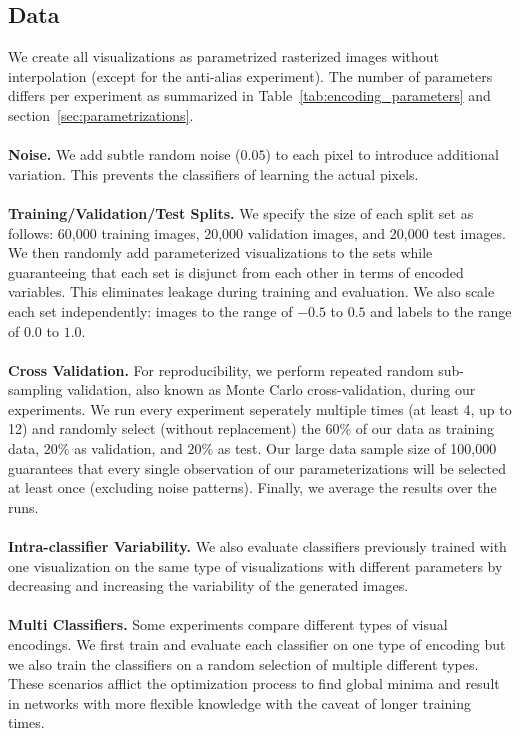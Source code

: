 \subsection{Data}
\label{sec:data}
We create all visualizations as parametrized rasterized images without interpolation (except for the anti-alias experiment). The number of parameters differs per experiment as summarized in Table~\ref{tab:encoding_parameters} and section~\ref{sec:parametrizations}. 
\\~\\
\noindent\textbf{Noise.} We add subtle random noise ($0.05$) to each pixel to introduce additional variation. This prevents the classifiers of learning the actual pixels.
\\~\\
\noindent\textbf{Training/Validation/Test Splits.} We specify the size of each split set as follows: 60,000 training images, 20,000 validation images, and 20,000 test images. We then randomly add parameterized visualizations to the sets while guaranteeing that each set is disjunct from each other in terms of encoded variables. This eliminates leakage during training and evaluation. We also scale each set independently: images to the range of $-0.5$ to $0.5$ and labels to the range of $0.0$ to $1.0$. 
\\~\\
\noindent\textbf{Cross Validation.} For reproducibility, we perform repeated random sub-sampling validation, also known as Monte Carlo cross-validation, during our experiments. We run every experiment seperately multiple times (at least 4, up to 12) and randomly select (without replacement) the $60\%$ of our data as training data, $20\%$ as validation, and $20\%$ as test. Our large data sample size of 100,000 guarantees that every single observation of our parameterizations will be selected at least once (excluding noise patterns). Finally, we average the results over the runs.
\\~\\
\noindent\textbf{Intra-classifier Variability.} We also evaluate classifiers previously trained with one visualization on the same type of visualizations with different parameters by decreasing and increasing the variability of the generated images.
\\~\\
\noindent\textbf{Multi Classifiers.} Some experiments compare different types of visual encodings. We first train and evaluate each classifier on one type of encoding but we also train the classifiers on a random selection of multiple different types. These scenarios afflict the optimization process to find global minima and result in networks with more flexible knowledge with the caveat of longer training times.
